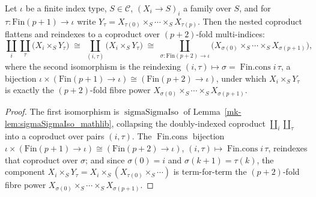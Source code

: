 \begin{lemma}\label{mk-lem:coproduct_fibrePower_reindex}
  \leanok

  Let \(\iota\) be a finite index type, \(S \in \mathcal{C}\), \((X_i \to S)_i\) a family over
  \(S\), and for \(\tau : \mathrm{Fin}(p+1)\to\iota\) write \(Y_\tau = X_{\tau(0)} \times_S \cdots
  \times_S X_{\tau(p)}\). Then the nested coproduct flattens and reindexes to a coproduct over
  \((p+2)\)-fold multi-indices:
  \[
    \coprod_{i}\coprod_{\tau} \bigl(X_i \times_S Y_\tau\bigr)
      \;\cong\;
    \coprod_{(i,\tau)} \bigl(X_i \times_S Y_\tau\bigr)
      \;\cong\;
    \coprod_{\sigma : \mathrm{Fin}(p+2) \to \iota}
      \bigl(X_{\sigma(0)} \times_S \cdots \times_S X_{\sigma(p+1)}\bigr),
  \]
  where the second isomorphism is the reindexing \((i, \tau) \mapsto \sigma =
  \operatorname{Fin.cons} i\,\tau\), a bijection \(\iota \times (\mathrm{Fin}(p+1)\to\iota) \cong
  (\mathrm{Fin}(p+2)\to\iota)\), under which \(X_i \times_S Y_\tau\) is exactly the \((p+2)\)-fold
  fibre power \(X_{\sigma(0)} \times_S \cdots \times_S X_{\sigma(p+1)}\).
\end{lemma}
\begin{proof}
  The first isomorphism is \(\operatorname{sigmaSigmaIso}\) of
  Lemma~\ref{mk-lem:sigmaSigmaIso_mathlib}, collapsing the doubly-indexed coproduct
  \(\coprod_i \coprod_\tau\) into a coproduct over pairs \((i,\tau)\). The
  \(\operatorname{Fin.cons}\) bijection \(\iota \times (\mathrm{Fin}(p+1)\to\iota) \cong
  (\mathrm{Fin}(p+2)\to\iota)\), \((i,\tau)\mapsto \operatorname{Fin.cons} i\,\tau\), reindexes that
  coproduct over \(\sigma\); and since \(\sigma(0) = i\) and \(\sigma(k+1) = \tau(k)\), the component
  \(X_i \times_S Y_\tau = X_i \times_S (X_{\tau(0)} \times_S \cdots)\) is term-for-term the
  \((p+2)\)-fold fibre power \(X_{\sigma(0)} \times_S \cdots \times_S X_{\sigma(p+1)}\).
\end{proof}

